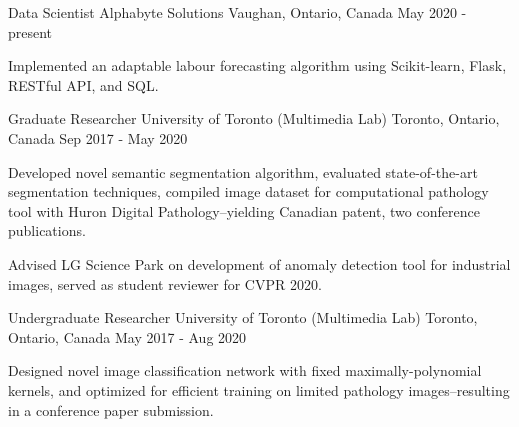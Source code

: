 

\begin{cventries}

  \cventry
    {Data Scientist} %
    {Alphabyte Solutions} %
    {Vaughan, Ontario, Canada} %
    {May 2020 - present} %
    {
      \begin{cvitems} %
        \item {Implemented an adaptable labour forecasting algorithm using Scikit-learn, Flask, RESTful API, and SQL.}
      \end{cvitems}
    }

  \cventry
    {Graduate Researcher} %
    {University of Toronto (Multimedia Lab)} %
    {Toronto, Ontario, Canada} %
    {Sep 2017 - May 2020} %
    {
      \begin{cvitems} %
        \item {Developed novel semantic segmentation algorithm, evaluated state-of-the-art segmentation techniques, compiled image dataset for computational pathology tool with Huron Digital Pathology--yielding Canadian patent, two conference publications.}
        \item {Advised LG Science Park on development of anomaly detection tool for industrial images, served as student reviewer for CVPR 2020.}
      \end{cvitems}
    }

  \cventry
    {Undergraduate Researcher} %
    {University of Toronto (Multimedia Lab)} %
    {Toronto, Ontario, Canada} %
    {May 2017 - Aug 2020} %
    {
      \begin{cvitems} %
        \item {Designed novel image classification network with fixed maximally-polynomial kernels, and optimized for efficient training on limited pathology images--resulting in a conference paper submission.}
      \end{cvitems}
    }
		

\end{cventries}
